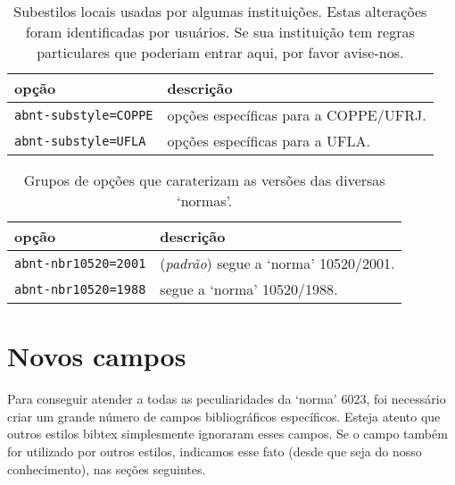 \documentclass[a4paper]{ltxdoc}
\begin{document}
\begin{table}[htbp]

\caption[Subestilos de diversas instituições]{
Subestilos locais usadas por algumas instituições. Estas alterações
foram identificadas por usuários. Se sua instituição
tem regras particulares que poderiam entrar aqui, por favor avise-nos.}
\label{tabela-subestilos}

\begin{center}
\begin{tabular}{lp{8cm}}\hline\hline
opção  & descrição \\ \hline
\texttt{abnt-substyle=COPPE} & opções específicas para a COPPE/UFRJ.\\
\texttt{abnt-substyle=UFLA} & opções específicas para a UFLA.\\
\hline\hline
\end{tabular}
\end{center}
\end{table}



\begin{table}[htbp]

\caption[Versão das `normas' a ser usada]{
Grupos de opções que caraterizam as versões das diversas `normas'.}
\label{tabela-versao-normas}

\begin{center}
\begin{tabular}{lp{8cm}}\hline\hline
opção & descrição \\ \hline
\texttt{abnt-nbr10520=2001} & (\emph{padrão}) segue a `norma' 10520/2001\cite{NBR10520:2001}.\\
\texttt{abnt-nbr10520=1988} & segue a `norma' 10520/1988\cite{NBR10520:1988}.\\
\hline\hline
\end{tabular}
\end{center}
\end{table}


\section{Novos campos}

Para conseguir atender a todas as peculiaridades da `norma'
6023\cite{NBR6023:2000}, foi necessário criar um grande número de campos
bibliográficos específicos. Esteja atento que outros estilos \textsf{bibtex}
simplesmente ignoraram esses campos. Se o campo também for utilizado por outros
estilos, indicamos esse fato (desde que seja do nosso conhecimento), nas seções
seguintes.
\end{document}
